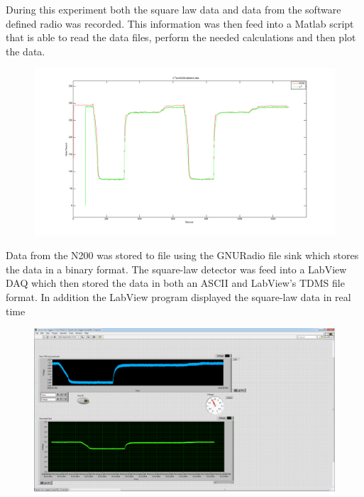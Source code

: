 During this experiment both the square law data and data from the software defined radio was recorded.  This information was then feed into a Matlab script that is able to read the data files, perform the needed calculations and then plot the data.  

\begin{figure}[h!tb] \centering

\includegraphics[width=\textwidth]{Images/lab1_both_calib.png}

\label{lab1_x2_n200}
\end{figure}

Data from the N200 was stored to file using the GNURadio file sink which stores the data in a binary format.  The square-law detector was feed into a LabView DAQ which then stored the data in both an ASCII and LabView's TDMS file format.  In addition the LabView program displayed the square-law data in real time

\begin{figure}[h!tb] \centering

\includegraphics[width=\textwidth]{Images/labviewx2_lab0.png}

\label{labview_tpr}
\end{figure}

